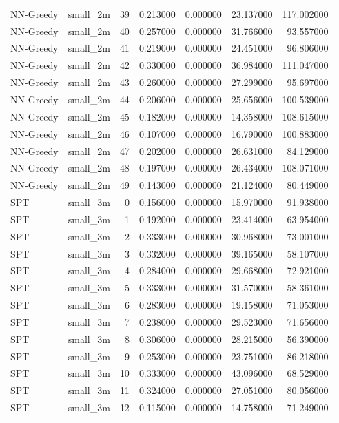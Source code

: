 \begin{tabular}{llrrrrr}
NN-Greedy & small_2m & 39 & 0.213000 & 0.000000 & 23.137000 & 117.002000 \\
NN-Greedy & small_2m & 40 & 0.257000 & 0.000000 & 31.766000 & 93.557000 \\
NN-Greedy & small_2m & 41 & 0.219000 & 0.000000 & 24.451000 & 96.806000 \\
NN-Greedy & small_2m & 42 & 0.330000 & 0.000000 & 36.984000 & 111.047000 \\
NN-Greedy & small_2m & 43 & 0.260000 & 0.000000 & 27.299000 & 95.697000 \\
NN-Greedy & small_2m & 44 & 0.206000 & 0.000000 & 25.656000 & 100.539000 \\
NN-Greedy & small_2m & 45 & 0.182000 & 0.000000 & 14.358000 & 108.615000 \\
NN-Greedy & small_2m & 46 & 0.107000 & 0.000000 & 16.790000 & 100.883000 \\
NN-Greedy & small_2m & 47 & 0.202000 & 0.000000 & 26.631000 & 84.129000 \\
NN-Greedy & small_2m & 48 & 0.197000 & 0.000000 & 26.434000 & 108.071000 \\
NN-Greedy & small_2m & 49 & 0.143000 & 0.000000 & 21.124000 & 80.449000 \\
SPT & small_3m & 0 & 0.156000 & 0.000000 & 15.970000 & 91.938000 \\
SPT & small_3m & 1 & 0.192000 & 0.000000 & 23.414000 & 63.954000 \\
SPT & small_3m & 2 & 0.333000 & 0.000000 & 30.968000 & 73.001000 \\
SPT & small_3m & 3 & 0.332000 & 0.000000 & 39.165000 & 58.107000 \\
SPT & small_3m & 4 & 0.284000 & 0.000000 & 29.668000 & 72.921000 \\
SPT & small_3m & 5 & 0.333000 & 0.000000 & 31.570000 & 58.361000 \\
SPT & small_3m & 6 & 0.283000 & 0.000000 & 19.158000 & 71.053000 \\
SPT & small_3m & 7 & 0.238000 & 0.000000 & 29.523000 & 71.656000 \\
SPT & small_3m & 8 & 0.306000 & 0.000000 & 28.215000 & 56.390000 \\
SPT & small_3m & 9 & 0.253000 & 0.000000 & 23.751000 & 86.218000 \\
SPT & small_3m & 10 & 0.333000 & 0.000000 & 43.096000 & 68.529000 \\
SPT & small_3m & 11 & 0.324000 & 0.000000 & 27.051000 & 80.056000 \\
SPT & small_3m & 12 & 0.115000 & 0.000000 & 14.758000 & 71.249000 \\

\end{tabular}
